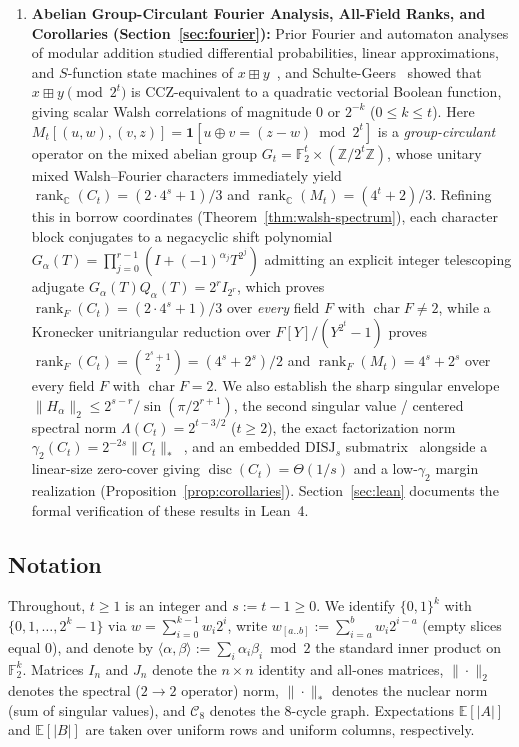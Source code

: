 \documentclass[11pt,reqno]{amsart}
\theoremstyle{definition}
\theoremstyle{remark}
\DeclareMathOperator{\rk}{rank}
\DeclareMathOperator{\disc}{disc}
\newcommand{\FF}{\mathbb{F}}
\newcommand{\ZZ}{\mathbb{Z}}
\newcommand{\CC}{\mathbb{C}}
\newcommand{\EE}{\mathbb{E}}
\newcommand{\ind}{\mathbf{1}}
\newcommand{\DISJ}{\mathrm{DISJ}}
\numberwithin{equation}{section}
\begin{document}
\begin{enumerate}[leftmargin=2em,label=\textbf{(\arabic*)}]
  \item \textbf{Abelian Group-Circulant Fourier Analysis, All-Field Ranks, and Corollaries (Section~\ref{sec:fourier}):}
  Prior Fourier and automaton analyses of modular addition studied differential probabilities, linear approximations, and $S$-function state machines of $x \boxplus y$~\cite{LM01,Wal03,Wal03b,LWD04,MVDP10}, and Schulte-Geers~\cite{SG13} showed that $x \boxplus y \pmod{2^t}$ is CCZ-equivalent to a quadratic vectorial Boolean function, giving scalar Walsh correlations of magnitude $0$ or $2^{-k}$ ($0 \le k \le t$). Here $M_t[(u, w), (v, z)] = \ind[u \oplus v = (z - w) \bmod 2^t]$ is a \emph{group-circulant} operator on the mixed abelian group $G_t = \FF_2^t \times (\ZZ/2^t\ZZ)$, whose unitary mixed Walsh--Fourier characters immediately yield $\rk_{\CC}(C_t) = (2\cdot 4^s + 1)/3$ and $\rk_{\CC}(M_t) = (4^t + 2)/3$. Refining this in borrow coordinates (Theorem~\ref{thm:walsh-spectrum}), each character block conjugates to a negacyclic shift polynomial $G_\alpha(T) = \prod_{j=0}^{r-1}(I + (-1)^{\alpha_j}T^{2^j})$ admitting an explicit integer telescoping adjugate $G_\alpha(T) Q_\alpha(T) = 2^r I_{2^r}$, which proves $\rk_F(C_t) = (2\cdot 4^s + 1)/3$ over \emph{every} field $F$ with $\operatorname{char} F \neq 2$, while a Kronecker unitriangular reduction over $F[Y]/(Y^{2^t} - 1)$ proves $\rk_F(C_t) = \binom{2^s + 1}{2} = (4^s + 2^s)/2$ and $\rk_F(M_t) = 4^s + 2^s$ over every field $F$ with $\operatorname{char} F = 2$. We also establish the sharp singular envelope $\|H_\alpha\|_2 \le 2^{s-r}/\sin(\pi/2^{r+1})$, the second singular value / centered spectral norm $\Lambda(C_t) = 2^{t-3/2}$ ($t \ge 2$), the exact factorization norm $\gamma_2(C_t) = 2^{-2s}\|C_t\|_*$~\cite{LS09}, and an embedded $\DISJ_s$ submatrix~\cite{KN97,Raz92,Raz03,AA05} alongside a linear-size zero-cover giving $\disc(C_t) = \Theta(1/s)$ and a low-$\gamma_2$ margin realization (Proposition~\ref{prop:corollaries}). Section~\ref{sec:lean} documents the formal verification of these results in Lean~4.
\end{enumerate}

\subsection{Notation}
Throughout, $t \ge 1$ is an integer and $s := t - 1 \ge 0$. We identify $\{0, 1\}^k$ with $\{0, 1, \dots, 2^k - 1\}$ via $w = \sum_{i=0}^{k-1} w_i 2^i$, write $w_{[a..b]} := \sum_{i=a}^b w_i 2^{i-a}$ (empty slices equal $0$), and denote by $\langle \alpha, \beta \rangle := \sum_i \alpha_i \beta_i \bmod 2$ the standard inner product on $\FF_2^k$. Matrices $I_n$ and $J_n$ denote the $n \times n$ identity and all-ones matrices, $\|\cdot\|_2$ denotes the spectral ($2 \to 2$ operator) norm, $\|\cdot\|_*$ denotes the nuclear norm (sum of singular values), and $\mathcal{C}_8$ denotes the $8$-cycle graph. Expectations $\EE[|A|]$ and $\EE[|B|]$ are taken over uniform rows and uniform columns, respectively.
\end{document}

